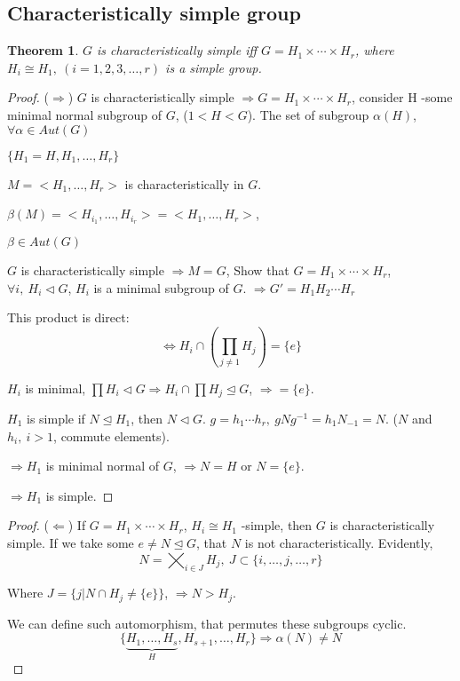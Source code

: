 \documentclass[12pt, a4paper]{article}
\newtheorem{theorem}{Theorem}[section]
\theoremstyle{definition}
\begin{document}
\subsection{Characteristically simple group}
\begin{theorem}
    $G$ is characteristically simple iff $ G = H_1\times \cdots \times H_r$, where 
    $ H_i \cong H_1,\ (i=1,2,3, \ldots  ,r)$ is a simple group.
\end{theorem}
\begin{proof}
    \par
    ($\Rightarrow$) $G$ is characteristically simple 
    $\Rightarrow G = H_1 \times \cdots \times H_r$, consider H -some minimal normal subgroup
    of $G$, ($1<H<G$). The set of subgroup $\alpha(H)$, $\forall \alpha \in Aut(G) $\par
    $\{ H_1 = H, H_1, \ldots, H_r\}$\par
    $M = <H_1, \ldots, H_r> $ is characteristically in $G$.\par
    $\beta (M) = <H_{i_1},\ldots, H_{i_r}> = <H_1, \ldots, H_r>$,\par
    $\beta\in Aut(G)$
    \par
    $G$ is characteristically simple $\Rightarrow M=G$, Show that $G = 
    H_1\times \cdots \times H_r$, $\forall i,\ H_i\lhd G $, $H_i$ is a minimal subgroup of 
    $G$. $\Rightarrow G'= H_1H_2\cdots H_r$
    \par
    This product is direct: \[\Leftrightarrow H_i\cap(\prod_{j\neq 1}{H_j})=\{e\}\]\par
    $H_i$ is minimal, $\prod H_i \lhd G \Rightarrow H_i\cap \prod{H_j\unlhd G} $, 
    $\Rightarrow =\{e\}$.\par
    $H_1$ is simple if $N\unlhd H_1$, then $N\lhd G$. $g = h_1\cdots h_r,\ 
    gNg^{-1} = h_1N_{-1}=N $. ($N$ and $h_i,\ i>1$, commute elements).\par
    $\Rightarrow H_1 $ is minimal normal of $G$, $\Rightarrow N=H $ or $N=\{e\} $.\par
    $\Rightarrow H_1$ is simple.
    \par
\end{proof}
\begin{proof}
    \par
    ($\Leftarrow$) If $G= H_1\times \cdots \times H_r$, $H_i\cong H_1$ -simple, then $G$ is 
    characteristically simple. If we take some $e\neq N\unlhd G $, that $N$ is not 
    characteristically. Evidently, 
    \[N=\bigtimes_{i\in J}H_j,\ J\subset \{i,\ldots,j,\ldots,r\}\]
    \par
    Where $J=\{j|N\cap H_j \neq\{e\} \}$, $\Rightarrow N>H_j$.
    \par
    We can define such automorphism, that permutes these subgroups cyclic.
    \[ \{\underbrace{H_1,\ldots, H_s}_H, H_{s+1},\ldots,H_r\}\Rightarrow \alpha(N)\neq N\]
\end{proof}
\end{document}
